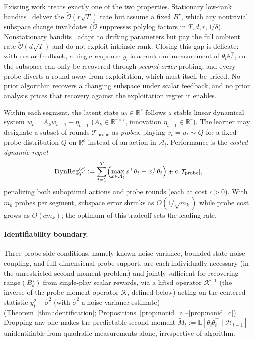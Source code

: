 \documentclass{article}
\newcommand{\R}{\mathbb{R}}
\newcommand{\E}{\mathbb{E}}
\newcommand{\cA}{\mathcal{A}}
\newcommand{\cH}{\mathcal{H}}
\newcommand{\cTprobe}{\mathcal{T}_{\mathrm{probe}}}
\newcommand{\tilO}{\widetilde{\mathcal{O}}}
\newcommand{\DynReg}{\mathrm{DynReg}}
\newcommand{\range}{\mathrm{range}}
\begin{document}
Existing work treats exactly one of the two properties.
Stationary low-rank
bandits~\citep{jun2019bilinear,jedra2024low,lu2021low}
deliver the $\tilO(r\sqrt T)$ rate but assume a fixed $B^\star$,
which any nontrivial subspace change invalidates
($\tilO$ suppresses polylog factors in $T,d,r,1/\delta$).
Nonstationary bandits~\citep{russac2019weighted,cheung2019learning}
adapt to drifting parameters but pay the full ambient rate
$\tilO(d\sqrt T)$ and do not exploit intrinsic rank. Closing this gap is
delicate: with scalar feedback, a single response $y_t$ is a rank-one
measurement of $\theta_t\theta_t^\top$, so the subspace can only be
recovered through \emph{second-order} probing, and every probe diverts
a round away from exploitation, which must itself be priced. No prior
algorithm recovers a changing subspace under scalar feedback, and no
prior analysis prices that recovery against the exploitation regret it
enables.

Within each segment, the latent state $w_t\in\R^r$ follows a stable
linear dynamical system $w_t=A_k w_{t-1}+\eta_{t-1}$ ($A_k\in\R^{r\times r}$,
innovation $\eta_{t-1}\in\R^r$). The learner may designate a subset
of rounds $\cTprobe$ as \emph{probes}, playing $x_t=u_t\sim Q$ for a
fixed probe distribution $Q$ on $\R^d$ instead of an action in $\cA_t$.
Performance is the \emph{costed dynamic regret}
\begin{equation}
\DynReg_T^{(c)} := \sum_{t=1}^T \Bigl(\max_{x\in\cA_t} x^\top \theta_t
  - x_t^\top \theta_t\Bigr) + c\,|\cTprobe|,
\label{eq:intro_costed_regret}
\end{equation}
penalizing both suboptimal actions and probe rounds (each at cost
$c>0$). With $m_k$ probes per segment, subspace error shrinks as
$O(1/\sqrt{m_k})$ while probe cost grows as $O(cm_k)$; the optimum
of this tradeoff sets the leading rate.

\paragraph{Identifiability boundary.}
  Three probe-side conditions, namely known noise variance, bounded
  state-noise coupling, and full-dimensional probe support, are each
  individually necessary (in the unrestricted-second-moment problem)
  and jointly sufficient for recovering $\range(B_k^\star)$ from
  single-play scalar rewards, via a lifted operator $\mathcal K^{-1}$
  (the inverse of the probe moment operator $\mathcal K$, defined
  below) acting on the centered statistic $y_t^2-\widehat\sigma^2$
  (with $\widehat\sigma^2$ a noise-variance estimate)
  (Theorem~\ref{thm:identification};
  Propositions~\ref{prop:nonid_a}--\ref{prop:nonid_c}). Dropping any
  one makes the predictable second moment
  $\widetilde M_t := \E[\theta_t\theta_t^\top\mid\cH_{t-1}]$
  unidentifiable from quadratic measurements alone, irrespective of
  algorithm.
\end{document}
